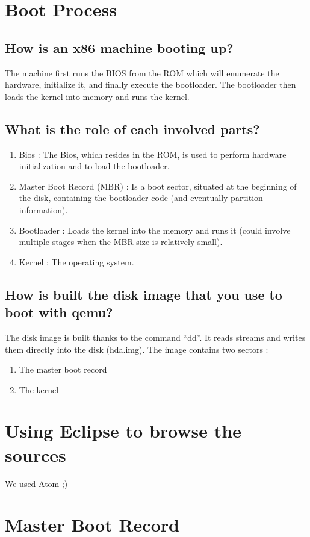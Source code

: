 \documentclass[10]{article}
\begin{document}
\section{Boot Process}

\subsection{How is an x86 machine booting up? }
The machine first runs the BIOS from the ROM which will enumerate the hardware, initialize it, and finally execute the bootloader. The bootloader then loads the kernel into memory and runs the kernel.

\subsection{What is the role of each involved parts?}
\begin{enumerate}
	\item
	Bios : The Bios, which resides in the ROM, is used to perform hardware initialization and to load the bootloader.
	\item
	Master Boot Record (MBR) : Is a boot sector, situated at the beginning of the disk, containing the bootloader code (and eventually partition information).
	\item
	Bootloader : Loads the kernel into the memory and runs it (could involve multiple stages when the MBR size is relatively small).
	\item
	Kernel : The operating system.
\end{enumerate}
\subsection{How is built the disk image that you use to boot with qemu?}
The disk image is built thanks to the command “dd”. It reads streams and writes them directly into the disk (hda.img).
The image contains two sectors :
\begin{enumerate}
	\item
	The master boot record
	\item
	The kernel
\end{enumerate}

\section{Using Eclipse to browse the sources}

We used Atom ;)

\section{Master Boot Record}
\end{document}
